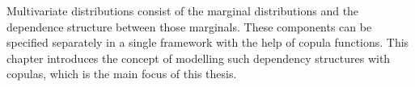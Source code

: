 
Multivariate distributions consist of the marginal distributions and the dependence structure between those marginals. These components can be specified separately in a single framework with the help of copula functions. This chapter introduces the concept of modelling such dependency structures with copulas, which is the main focus of this thesis.